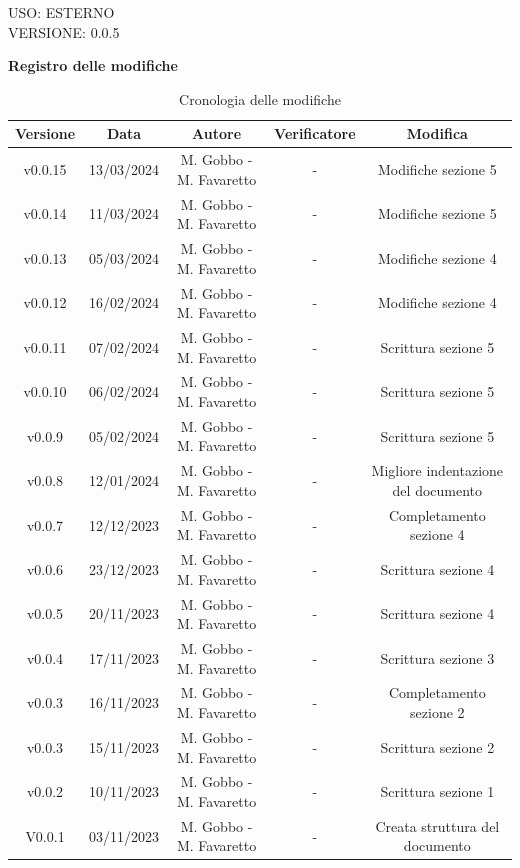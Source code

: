 \documentclass[5pt]{article}
\begin{document}
\begin{flushright}
    \begin{spacing}{1}
        USO: ESTERNO\\
        VERSIONE: 0.0.5\\
    \end{spacing}
\end{flushright}


\restoregeometry

\pagebreak

\textbf{\Large Registro delle modifiche}
\begin{table}[H]
  \centering
  \begin{tabular}{|c|c|c|c|c|}
    \hline
    \textbf{Versione} & \textbf{Data} & \textbf{Autore} & \textbf{Verificatore} & \textbf{Modifica} \\
    \hline
    v0.0.15 & 13/03/2024 & M. Gobbo - M. Favaretto & - & Modifiche sezione 5 \\
    \hline
    v0.0.14 & 11/03/2024 & M. Gobbo - M. Favaretto & - & Modifiche sezione 5 \\
    \hline
    v0.0.13 & 05/03/2024 & M. Gobbo - M. Favaretto & - & Modifiche sezione 4 \\
    \hline
    v0.0.12 & 16/02/2024 & M. Gobbo - M. Favaretto & - & Modifiche sezione 4 \\
    \hline
    v0.0.11 & 07/02/2024 & M. Gobbo - M. Favaretto & - & Scrittura sezione 5 \\
    \hline
    v0.0.10 & 06/02/2024 & M. Gobbo - M. Favaretto & - & Scrittura sezione 5 \\
    \hline
    v0.0.9 & 05/02/2024 & M. Gobbo - M. Favaretto & - & Scrittura sezione 5 \\
    \hline
    v0.0.8 & 12/01/2024 & M. Gobbo - M. Favaretto & - & Migliore indentazione del documento \\
    \hline
    v0.0.7 & 12/12/2023 & M. Gobbo - M. Favaretto & - & Completamento sezione 4 \\
    \hline
    v0.0.6 & 23/12/2023 & M. Gobbo - M. Favaretto & - & Scrittura sezione 4 \\
    \hline
    v0.0.5 & 20/11/2023 & M. Gobbo - M. Favaretto & - & Scrittura sezione 4 \\
    \hline
    v0.0.4 & 17/11/2023 & M. Gobbo - M. Favaretto & - & Scrittura sezione 3 \\
    \hline
    v0.0.3 & 16/11/2023 & M. Gobbo - M. Favaretto & - & Completamento sezione 2 \\
    \hline
    v0.0.3 & 15/11/2023 & M. Gobbo - M. Favaretto & - & Scrittura sezione 2 \\
    \hline
    v0.0.2 & 10/11/2023 & M. Gobbo - M. Favaretto & - & Scrittura sezione 1 \\
    \hline
    V0.0.1 & 03/11/2023 & M. Gobbo - M. Favaretto & - & Creata struttura del documento \\
    \hline
  \end{tabular}
  \caption{Cronologia delle modifiche}
  \label{tab:conference}
\end{table}
\end{document}

